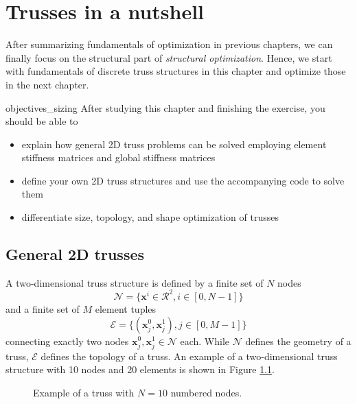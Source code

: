 \chapter{Trusses in a nutshell}
After summarizing fundamentals of optimization in previous chapters, we can finally focus on the structural part of \emph{structural optimization}. Hence, we start with fundamentals of discrete truss structures in this chapter and optimize those in the next chapter. 


\begin{objectives}{}{objectives_sizing}
After studying this chapter and finishing the exercise, you should be able to 
\begin{itemize}[label=$\dots$]
    \item explain how general 2D truss problems can be solved employing element stiffness matrices and global stiffness matrices
    \item define your own 2D truss structures and use the accompanying code to solve them
    \item differentiate size, topology, and shape optimization of trusses
\end{itemize}
\end{objectives}

\section{General 2D trusses}
A two-dimensional truss structure is defined by a finite set of $N$ nodes 
\begin{equation}
    \mathcal{N}=\{\mathbf{x}^i \in \mathcal{R}^2, i \in [0, N-1]\}
\end{equation} and a finite set of $M$ element tuples 
\begin{equation}
    \mathcal{E} = \{(\mathbf{x}^0_j, \mathbf{x}^1_j), j \in [0, M-1]\}
\end{equation} 
connecting exactly two nodes $\mathbf{x}^0_j,  \mathbf{x}^1_j \in \mathcal{N}$ each. While $\mathcal{N}$ defines the geometry of a truss, $\mathcal{E}$ defines the topology of a truss. An example of a two-dimensional truss structure with 10 nodes and 20 elements is shown in Figure \ref{fig:truss_example}.

\begin{figure}[!htpb]
    \centering
    
    \caption{Example of a truss with $N=10$ numbered nodes.}
    \label{fig:truss_example}
\end{figure}


